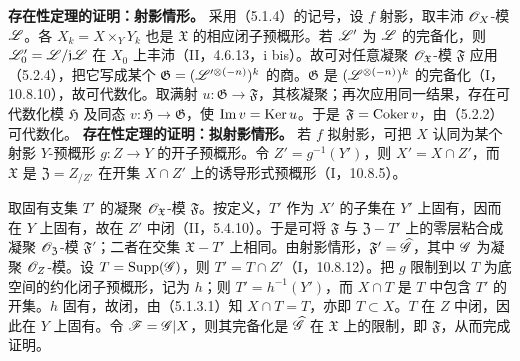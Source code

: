 \textbf{存在性定理的证明：射影情形。}
采用（5.1.4）的记号，设 $f$ 射影，取丰沛 $\mathscr O_X$-模 $\mathscr L$。各 $X_k=X\times_YY_k$ 也是 $\mathfrak X$ 的相应闭子预概形。若 $\mathscr L'$ 为 $\mathscr L$ 的完备化，则 $\mathscr L'_0=\mathscr L/\mathfrak j\mathscr L$ 在 $X_0$ 上丰沛（II，4.6.13，i bis）。故可对任意凝聚 $\mathscr O_{\mathfrak X}$-模 $\mathfrak F$ 应用（5.2.4），把它写成某个 $\mathfrak G=(\mathscr L'^{\otimes(-n)})^k$ 的商。$\mathfrak G$ 是 $(\mathscr L^{\otimes(-n)})^k$ 的完备化（I，10.8.10），故可代数化。取满射 $u:\mathfrak G\to\mathfrak F$，其核凝聚；再次应用同一结果，存在可代数化模 $\mathfrak H$ 及同态 $v:\mathfrak H\to\mathfrak G$，使 $\operatorname{Im} v=\operatorname{Ker} u$。于是 $\mathfrak F=\operatorname{Coker} v$，由（5.2.2）可代数化。
\textbf{存在性定理的证明：拟射影情形。}
若 $f$ 拟射影，可把 $X$ 认同为某个射影 $Y$-预概形 $g:Z\to Y$ 的开子预概形。令 $Z'=g^{-1}(Y')$，则 $X'=X\cap Z'$，而 $\mathfrak X$ 是 $\mathfrak Z=Z_{/Z'}$ 在开集 $X\cap Z'$ 上的诱导形式预概形（I，10.8.5）。

取固有支集 $T'$ 的凝聚 $\mathscr O_{\mathfrak X}$-模 $\mathfrak F$。按定义，$T'$ 作为 $X'$ 的子集在 $Y'$ 上固有，因而在 $Y$ 上固有，故在 $Z'$ 中闭（II，5.4.10）。于是可将 $\mathfrak F$ 与 $\mathfrak Z-T'$ 上的零层粘合成凝聚 $\mathscr O_{\mathfrak Z}$-模 $\mathfrak F'$；二者在交集 $\mathfrak X-T'$ 上相同。由射影情形，$\mathfrak F'=\widehat{\mathscr G}$，其中 $\mathscr G$ 为凝聚 $\mathscr O_Z$-模。设 $T=\operatorname{Supp}(\mathscr G)$，则 $T'=T\cap Z'$（I，10.8.12）。把 $g$ 限制到以 $T$ 为底空间的约化闭子预概形，记为 $h$；则 $T'=h^{-1}(Y')$，而 $X\cap T$ 是 $T$ 中包含 $T'$ 的开集。$h$ 固有，故闭，由（5.1.3.1）知 $X\cap T=T$，亦即 $T\subset X$。$T$ 在 $Z$ 中闭，因此在 $Y$ 上固有。令 $\mathscr F=\mathscr G|X$，则其完备化是 $\widehat{\mathscr G}$ 在 $\mathfrak X$ 上的限制，即 $\mathfrak F$，从而完成证明。\par

